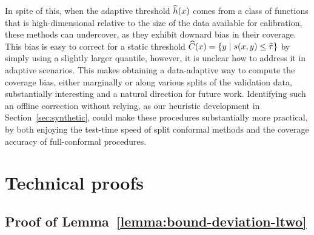 \documentclass[11pt]{article}
\newcommand{\scorefunc}{s}
\newcommand{\scoreval}{\scorefunc}
\begin{document}
In spite of this, when the adaptive threshold
$\widehat{h}(x)$ comes from a class of functions that is high-dimensional
relative to the size of the data available for calibration,
these methods can undercover, as they exhibit downard bias in their
coverage.
%
This bias is easy to correct for a static threshold
$\what{C}(x) = \{y \mid \scoreval(x, y) \le \what{\tau}\}$ by
simply using a slightly larger quantile, however, it is
unclear how to address it in adaptive scenarios.
%
This makes obtaining a data-adaptive way to compute the coverage bias,
either marginally or along various splits of the validation data,
substantially interesting and a natural direction for future work.
%
Identifying such an offline correction without relying, as our heuristic
development in Section~\ref{sec:synthetic}, could make these procedures
substantially more practical, by both enjoying the test-time speed of split
conformal methods and the coverage accuracy of full-conformal procedures.

\appendix

\section{Technical proofs}

\subsection{Proof of Lemma~\ref{lemma:bound-deviation-ltwo}}
\label{sec:proof-bound-deviation-ltwo}
\end{document}
